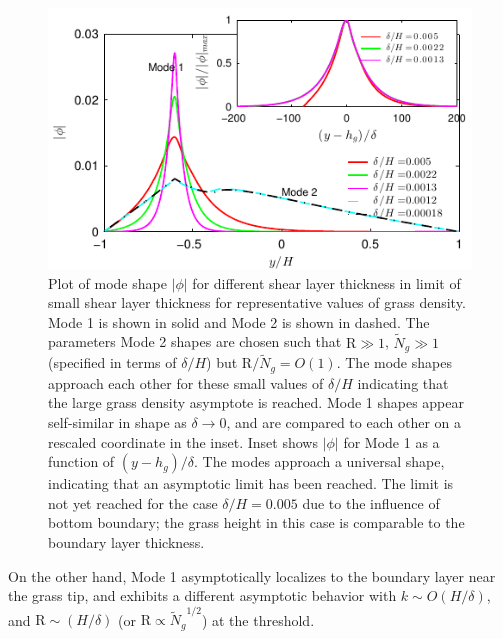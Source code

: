 \documentclass[aps,prl,twocolumn,superscriptaddress,10pt]{revtex4-1}  %
\newcommand{\hg}{h_g}
\newcommand{\Rey}{\text{R}}
\newcommand{\Ndg}{\tilde{N}_g}
\begin{document}
\begin{figure}
\includegraphics[]{Asymptotic_noshear}
\caption{Plot of mode shape $|\phi|$ for different shear layer thickness in limit of small shear layer thickness for representative values of grass density. 
Mode 1 is shown in solid and Mode 2 is shown in dashed. The parameters Mode 2 shapes are chosen such that $\Rey \gg 1$, $\Ndg \gg 1$ (specified in terms of $\delta/H$) but $\Rey/\Ndg = O(1)$. 
The mode shapes approach each other for these small values of $\delta/H$ indicating that the large grass density asymptote is reached. Mode 1 shapes appear self-similar in shape as $\delta\to 0$, 
and are compared to each other on a rescaled coordinate in the inset. 
Inset shows $|\phi|$ for Mode 1 as a function of $(y-\hg)/\delta$. The modes approach a universal shape, indicating that an asymptotic limit has been reached. 
The limit is not yet reached for the case $\delta/H = 0.005$ due to the influence of bottom boundary; the grass height in this case is comparable to the boundary layer thickness.}
\label{Asymptotic_mode}
\end{figure}

On the other hand, Mode 1 asymptotically localizes to the boundary layer near the grass tip, and exhibits a different asymptotic behavior with $k \sim O(H/\delta)$, and $\Rey \sim (H/\delta)$ (or $\Rey \propto {\Ndg}^{1/2}$) at the threshold. 
\end{document}
